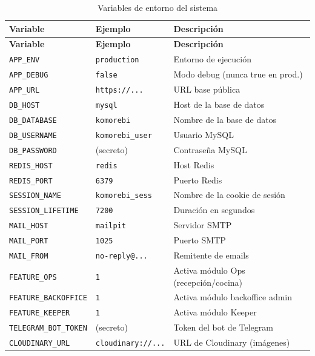 \documentclass[12pt,a4paper,twoside,openright]{report}
\begin{document}
\begin{appendices}
\begin{longtable}{@{}lp{4cm}p{5cm}@{}}
  \caption{Variables de entorno del sistema}
  \label{tab:envvars}\\
  \toprule
  \textbf{Variable} & \textbf{Ejemplo} & \textbf{Descripción}\\
  \midrule
  \endfirsthead
  \toprule
  \textbf{Variable} & \textbf{Ejemplo} & \textbf{Descripción}\\
  \midrule
  \endhead
  \bottomrule
  \endfoot
  \texttt{APP\_ENV}          & \texttt{production}      & Entorno de ejecución\\
  \texttt{APP\_DEBUG}        & \texttt{false}            & Modo debug (nunca true en prod.)\\
  \texttt{APP\_URL}          & \texttt{https://...}      & URL base pública\\
  \texttt{DB\_HOST}          & \texttt{mysql}            & Host de la base de datos\\
  \texttt{DB\_DATABASE}      & \texttt{komorebi}         & Nombre de la base de datos\\
  \texttt{DB\_USERNAME}      & \texttt{komorebi\_user}   & Usuario MySQL\\
  \texttt{DB\_PASSWORD}      & (secreto)                 & Contraseña MySQL\\
  \texttt{REDIS\_HOST}       & \texttt{redis}            & Host Redis\\
  \texttt{REDIS\_PORT}       & \texttt{6379}             & Puerto Redis\\
  \texttt{SESSION\_NAME}     & \texttt{komorebi\_sess}   & Nombre de la cookie de sesión\\
  \texttt{SESSION\_LIFETIME} & \texttt{7200}             & Duración en segundos\\
  \texttt{MAIL\_HOST}        & \texttt{mailpit}          & Servidor SMTP\\
  \texttt{MAIL\_PORT}        & \texttt{1025}             & Puerto SMTP\\
  \texttt{MAIL\_FROM}        & \texttt{no-reply@...}     & Remitente de emails\\
  \texttt{FEATURE\_OPS}      & \texttt{1}                & Activa módulo Ops (recepción/cocina)\\
  \texttt{FEATURE\_BACKOFFICE}& \texttt{1}               & Activa módulo backoffice admin\\
  \texttt{FEATURE\_KEEPER}   & \texttt{1}                & Activa módulo Keeper\\
  \texttt{TELEGRAM\_BOT\_TOKEN}& (secreto)               & Token del bot de Telegram\\
  \texttt{CLOUDINARY\_URL}   & \texttt{cloudinary://...} & URL de Cloudinary (imágenes)\\
\end{longtable}


\end{appendices}
\end{document}
